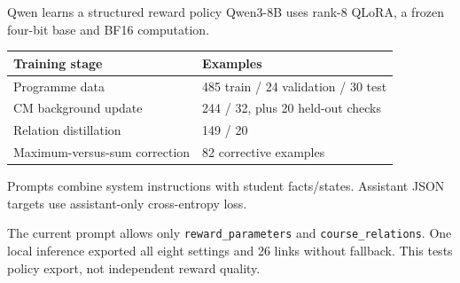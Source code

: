 \documentclass[aspectratio=169,11pt]{beamer}
\newcommand{\smallnote}[1]{\par{\footnotesize\color{muted}#1\par}}
\begin{document}
\begin{frame}{Qwen learns a structured reward policy}
Qwen3-8B uses rank-8 QLoRA, a frozen four-bit base and BF16 computation.
\vspace{1mm}
\begin{tabular}{L{7.5cm}L{4.8cm}}
\toprule
Training stage & Examples\\\midrule
Programme data & 485 train / 24 validation / 30 test\\
CM background update & 244 / 32, plus 20 held-out checks\\
Relation distillation & 149 / 20\\
Maximum-versus-sum correction & 82 corrective examples\\
\bottomrule
\end{tabular}\par
\vspace{2mm}
Prompts combine system instructions with student facts/states. Assistant JSON targets use assistant-only cross-entropy loss.
\smallnote{The current prompt allows only \texttt{reward\_parameters} and \texttt{course\_relations}. One local inference exported all eight settings and 26 links without fallback. This tests policy export, not independent reward quality.}
\end{frame}
\end{document}
